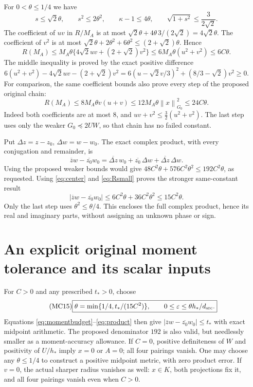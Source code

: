 \documentclass[11pt]{article}
\newcommand{\norm}[1]{\left\lVert#1\right\rVert}
\begin{document}
For $0<\theta\le1/4$ we have
\[
 s\le\sqrt2\theta,\qquad s^2\le2\theta^2,\qquad
 \kappa-1\le4\theta,\qquad
 \sqrt{1+s^2}\le\frac3{2\sqrt2}.
\]
The coefficient of $uv$ in $R/M_A$ is at most
$\sqrt2\theta+4\theta\,3/(2\sqrt2)=4\sqrt2\theta$.
The coefficient of $v^2$ is at most
$\sqrt2\theta+2\theta^2+6\theta^2
\le(2+\sqrt2)\theta$. Hence
\begin{equation}\tag{MC13}\label{eq:Rsmall}
 R(M_A)\le M_A\theta\{4\sqrt2uv+(2+\sqrt2)v^2\}
          \le6M_A\theta(u^2+v^2)\le6C\theta.
\end{equation}
The middle inequality is proved by the exact positive difference
\[
 6(u^2+v^2)-4\sqrt2uv-(2+\sqrt2)v^2
 =6(u-\sqrt2v/3)^2+(8/3-\sqrt2)v^2\ge0.
\]
For comparison, the same coefficient bounds also prove every
step of the proposed original chain:
\[
 R(M_A)\le8M_A\theta v(u+v)
 \le12M_A\theta\norm{x}_{G_0}^2\le24C\theta.
\]
Indeed both coefficients are at most $8$, and
$uv+v^2\le\tfrac32(u^2+v^2)$. The last step uses only the
weaker $G_0\preceq2UW$, so that chain has no failed constant.

Put $\Delta z=z-z_0$, $\Delta w=w-w_0$. The exact complex
product, with every conjugation and remainder, is
\[
 \overline z w-\overline{z_0}w_0
  =\overline{\Delta z}\,w_0+\overline{z_0}\,\Delta w
                          +\overline{\Delta z}\,\Delta w.
\]
Using the proposed weaker bounds would give
$48C^2\theta+576C^2\theta^2\le192C^2\theta$, as requested.
Using \eqref{eq:center} and \eqref{eq:Rsmall} proves the stronger
same-constant result
\begin{equation}\tag{MC14}\label{eq:product}
 \boxed{|\overline z w-\overline{z_0}w_0|
       \le6C^2\theta+36C^2\theta^2\le15C^2\theta.}
\end{equation}
Only the last step uses $\theta^2\le\theta/4$. This encloses
the full complex product, hence its real and imaginary parts,
without assigning an unknown phase or sign.

\section{An explicit original moment tolerance and its scalar inputs}

For $C>0$ and any prescribed $t_*>0$, choose
\begin{equation}\tag{MC15}\label{eq:final}
 \boxed{\theta=\min\{1/4,t_*/(15C^2)\},\qquad
 0\le\varepsilon\le\theta h_*/d_{\rm src}.}
\end{equation}
Equations \eqref{eq:momentbudget}--\eqref{eq:product} then give
$|\overline z w-\overline{z_0}w_0|\le t_*$ with exact midpoint
arithmetic. The proposed denominator $192$ is also valid, but
needlessly smaller as a moment-accuracy allowance. If $C=0$,
positive definiteness of $W$ and positivity of $U/h_*$ imply
$x=0$ or $A=0$; all four pairings vanish. One may choose any
$\theta\le1/4$ to construct a positive midpoint metric, with
zero product error. If $v=0$, the actual sharper radius vanishes
as well: $x\in K$, both projections fix it, and all four pairings
vanish even when $C>0$.
\end{document}
